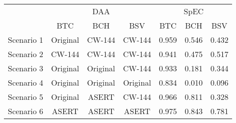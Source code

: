 
\begin{tabular}[t]{lcccccc}
\toprule
\multicolumn{1}{c}{ } & \multicolumn{3}{c}{DAA} & \multicolumn{3}{c}{SpEC} \\
\cmidrule(l{3pt}r{3pt}){2-4} \cmidrule(l{3pt}r{3pt}){5-7}
 & BTC & BCH & BSV & BTC & BCH & BSV\\
\midrule
Scenario 1 & Original & CW-144 & CW-144 & 0.959 & 0.546 & 0.432\\
Scenario 2 & CW-144 & CW-144 & CW-144 & 0.941 & 0.475 & 0.517\\
Scenario 3 & Original & Original & CW-144 & 0.933 & 0.181 & 0.344\\
Scenario 4 & Original & Original & Original & 0.834 & 0.010 & 0.096\\
Scenario 5 & Original & ASERT & CW-144 & 0.966 & 0.811 & 0.328\\
Scenario 6 & ASERT & ASERT & ASERT & 0.975 & 0.843 & 0.781\\
\bottomrule
\end{tabular}
